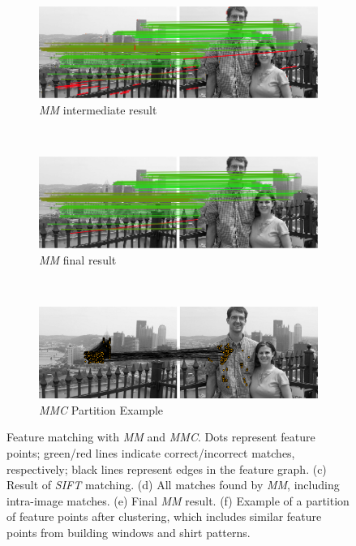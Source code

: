 \documentclass{article}
\begin{document}
\begin{figure}
		\\ %
		\begin{subfigure}[t]{\columnwidth}
			\centering
			\includegraphics[width=0.85\columnwidth]{images/mirror_match_with_pruned}
			\caption{\emph{MM} intermediate result}
			\label{fig:within}
		\end{subfigure}%
		\\ %
		\begin{subfigure}[t]{\columnwidth}
			\centering
			\includegraphics[width=0.85\columnwidth]{images/mirror_match}
			\caption{\emph{MM} final result}
			\label{fig:without}
		\end{subfigure}%
		\\ %
		\begin{subfigure}[t]{\columnwidth}
			\centering
			\includegraphics[width=0.85\columnwidth]{images/MMC_partition}
			\caption{\emph{MMC} Partition Example}
			\label{fig:pitts_partition}
		\end{subfigure}%
	\caption{Feature matching with \emph{MM} and \emph{MMC}. Dots represent feature points; green/red lines indicate correct/incorrect matches, respectively; black lines represent edges in the feature graph.  
	(c) Result of \emph{SIFT} matching. 
  (d) All matches found by \emph{MM}, including intra-image matches. 
	(e) Final \emph{MM} result. 
	(f) Example of a partition of feature points after clustering, which 
includes similar feature points from building windows and shirt patterns.}%
	\label{fig:comparemirror}%
\end{figure}%
\end{document}
